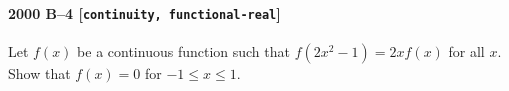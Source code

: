 \paragraph{2000 B--4 \textnormal{[\texttt{continuity, functional-real}]}}
Let $f(x)$ be a continuous function such that $f(2x^2-1)=2xf(x)$ for
all $x$. Show that $f(x)=0$ for $-1\leq x\leq 1$.
